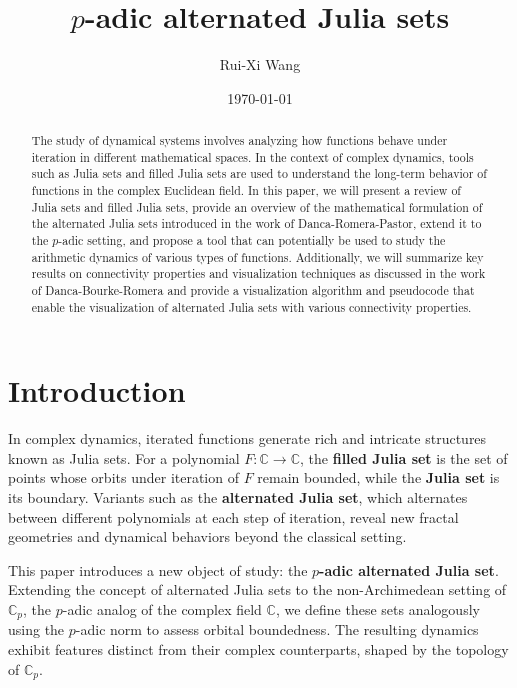 \documentclass{amsart}
\title{$p$-adic alternated Julia sets}
\author{Rui-Xi Wang}
\date{\today}
\theoremstyle{plain}
\theoremstyle{definition}
\theoremstyle{remark}
\numberwithin{equation}{section}
\newcommand{\C}{\mathbb{C}}
\begin{document}
\begin{abstract}
  The study of dynamical systems involves analyzing how functions behave under iteration in different mathematical spaces. In the context of complex dynamics, tools such as Julia sets and filled Julia sets are used to understand the long-term behavior of functions in the complex Euclidean field. In this paper, we will present a review of Julia sets and filled Julia sets, provide an overview of the mathematical formulation of the alternated Julia sets introduced in the work of Danca-Romera-Pastor, extend it to the $p$-adic setting, and propose a tool that can potentially be used to study the arithmetic dynamics of various types of functions. Additionally, we will summarize key results on connectivity properties and visualization techniques as discussed in the work of Danca-Bourke-Romera and provide a visualization algorithm and pseudocode that enable the visualization of alternated Julia sets with various connectivity properties.
\end{abstract}


\maketitle


\setcounter{tocdepth}{2} %
\tableofcontents



\section{Introduction}
In complex dynamics, iterated functions generate rich and intricate structures known as Julia sets. For a polynomial 
\( F: \C \to \C \), the \textbf{filled Julia set} is the set of points whose orbits under iteration of \( F \) remain bounded, while the \textbf{Julia set} is its boundary. 
Variants such as the \textbf{alternated Julia set}, which alternates between different polynomials at each step of iteration, reveal new fractal geometries and dynamical behaviors beyond the classical setting.

This paper introduces a new object of study: the \textbf{$p$-adic alternated Julia set}. Extending the concept of alternated Julia sets to the non-Archimedean setting of $\C_p$, the $p$-adic analog of the complex field $\C$, we define these sets analogously using the $p$-adic norm to assess orbital boundedness. The resulting dynamics exhibit features distinct from their complex counterparts, shaped by the topology of $\C_p$.
\end{document}
